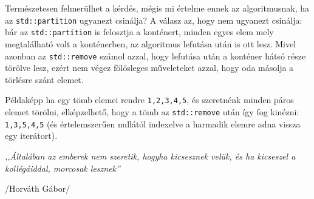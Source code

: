 \documentclass[../cpp_book/cpp_book.tex]{subfiles}
\begin{document}
	\medskip
	Természetesen felmerülhet a kérdés, mégis mi értelme ennek az algoritmusnak, ha az \texttt{std::partition} ugyanezt csinálja? A válasz az, hogy nem ugyanezt csinálja: bár az \texttt{std::partition} is felosztja a konténert, minden egyes elem mely megtalálható volt a konténerben, az algoritmus lefutása után is ott lesz. Mivel azonban az \texttt{std::remove} számol azzal, hogy lefutása után a konténer hátsó része törölve lesz, ezért nem végez fölösleges műveleteket azzal, hogy oda másolja a törlésre szánt elemet.
	
	Példaképp ha egy tömb elemei rendre \texttt{1,2,3,4,5}, és szeretnénk minden páros elemet törölni, elképzelhető, hogy a tömb az \texttt{std::remove} után így fog kinézni: \texttt{1,3,5,4,5} (és értelemszerűen nullától indexelve a harmadik elemre adna vissza egy iterátort).
	\begin{center}
		\textit{,,Általában az emberek nem szeretik, hogyha kicsesznek velük, és ha kicseszel a kollégáiddal, morcosak lesznek''}
		
		/Horváth Gábor/
	\end{center}
\end{document}
